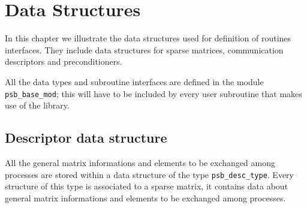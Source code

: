\section{Data Structures}
\label{sec:datastruct}

In this chapter we  illustrate the  data structures used for definition of
routines interfaces. They  include data structures for sparse matrices,
communication descriptors and preconditioners.%

All the data types and subroutine interfaces are defined in the module
\verb|psb_base_mod|; this will have to be included by every user
subroutine that makes use of the library. 



\subsection{Descriptor data structure}
\label{sec:desc}
All the general matrix informations and elements to be
exchanged among processes are stored within a data structure of the
type \hypertarget{descdata}{{\tt psb\_desc\_type}}. 
Every structure of this type is associated to a sparse matrix, it
contains data about general matrix informations and elements to be
exchanged among processes.  

